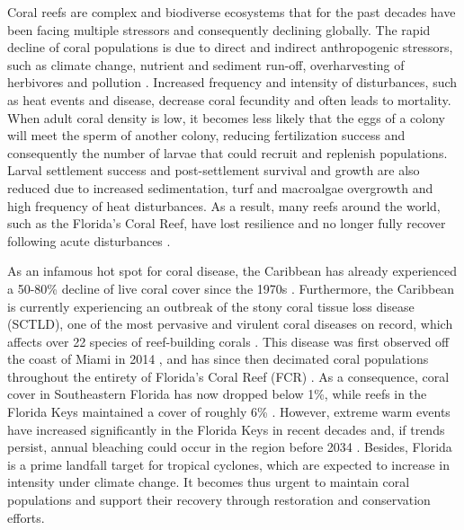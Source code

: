 \documentclass[preprint,12pt,authoryear]{elsarticle}
\begin{document}
Coral reefs are complex and biodiverse ecosystems that for the past decades have been facing multiple stressors and consequently declining globally. The rapid decline of coral populations is due to direct and indirect anthropogenic stressors, such as climate change, nutrient and sediment run-off, overharvesting of herbivores and pollution \citep{hughes2003climate, hughes2018spatial, hoegh2007coral, hoegh2017coral}. Increased frequency and intensity of disturbances, such as heat events and disease, decrease coral fecundity and often leads to mortality. When adult coral density is low, it becomes less likely that the eggs of a colony will meet the sperm of another colony, reducing fertilization success and consequently the number of larvae that could recruit and replenish populations. Larval settlement success and post-settlement survival and growth are also reduced due to increased sedimentation, turf and macroalgae overgrowth and high frequency of heat disturbances. As a result, many reefs around the world, such as the Florida’s Coral Reef, have lost resilience and no longer fully recover following acute disturbances \citep{jones2022frequent}.

As an infamous hot spot for coral disease, the Caribbean has already experienced a 50-80\% decline of live coral cover since the 1970s \citep{gardner2003long,jackson2014status}. Furthermore, the Caribbean is currently experiencing an outbreak of the stony coral tissue loss disease (SCTLD), one of the most pervasive and virulent coral diseases on record, which affects over 22 species of reef-building corals \citep{noaa2018,meiling2021variable}. This disease was first observed off the coast of Miami in 2014 \citep{precht2016unprecedented}, and has since then decimated coral populations throughout the entirety of Florida's Coral Reef (FCR) \citep{williams2021fine,frrp2021}. As a consequence, coral cover in Southeastern Florida has now dropped below 1\%, while reefs in the Florida Keys maintained a cover of roughly 6\% \citep{grove2022national}. However, extreme warm events have increased significantly in the Florida Keys in recent decades and, if trends persist, annual bleaching could occur in the region before 2034 \citep{manzello2015rapid}. Besides, Florida is a prime landfall target for tropical cyclones, which are expected to increase in intensity under climate change. It becomes thus urgent to maintain coral populations and support their recovery through restoration and conservation efforts.
\end{document}
